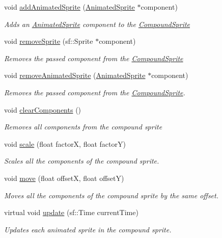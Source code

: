 \begin{DoxyCompactItemize}
void \hyperlink{class_compound_sprite_af7e1ddd3e7b682ff2d386cc71a211019}{add\+Animated\+Sprite} (\hyperlink{class_animated_sprite}{Animated\+Sprite} $\ast$component)
\begin{DoxyCompactList}\small\item\em Adds an \hyperlink{class_animated_sprite}{Animated\+Sprite} component to the \hyperlink{class_compound_sprite}{Compound\+Sprite} \end{DoxyCompactList}\item 
void \hyperlink{class_compound_sprite_ae673d681620b0e8805b692a80c1548a3}{remove\+Sprite} (sf\+::\+Sprite $\ast$component)
\begin{DoxyCompactList}\small\item\em Removes the passed component from the \hyperlink{class_compound_sprite}{Compound\+Sprite} \end{DoxyCompactList}\item 
void \hyperlink{class_compound_sprite_ad2cf68974d376edab2d657437c06deb2}{remove\+Animated\+Sprite} (\hyperlink{class_animated_sprite}{Animated\+Sprite} $\ast$component)
\begin{DoxyCompactList}\small\item\em Removes the passed component from the \hyperlink{class_compound_sprite}{Compound\+Sprite}. \end{DoxyCompactList}\item 
void \hyperlink{class_compound_sprite_a5425526371c2c00586b757f93770edc4}{clear\+Components} ()
\begin{DoxyCompactList}\small\item\em Removes all components from the compound sprite \end{DoxyCompactList}\item 
void \hyperlink{class_compound_sprite_adec10c3d85333f75e767b6dc3210b0e7}{scale} (float factorX, float factorY)
\begin{DoxyCompactList}\small\item\em Scales all the components of the compound sprite. \end{DoxyCompactList}\item 
void \hyperlink{class_compound_sprite_a8d9e7f79dc9c3137f1ff24c5201f61ec}{move} (float offsetX, float offsetY)
\begin{DoxyCompactList}\small\item\em Moves all the components of the compound sprite by the same offset. \end{DoxyCompactList}\item 
virtual void \hyperlink{class_compound_sprite_a0761cc2bdded00f203db7e4c6d02aa6c}{update} (sf\+::\+Time current\+Time)
\begin{DoxyCompactList}\small\item\em Updates each animated sprite in the compound sprite. \end{DoxyCompactList}\end{DoxyCompactItemize}
